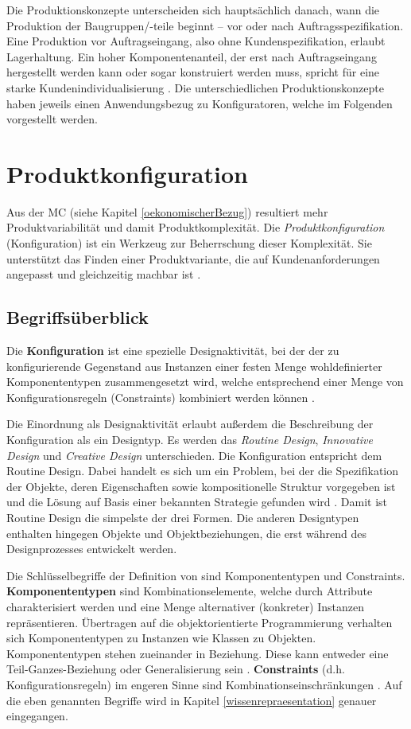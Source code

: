 \documentclass[11pt, a4paper, titlepage, listof=totoc, bibliography=totoc, index=totoc, twoside, openright, headings=normal]{scrreprt}
\begin{document}
Die Produktionskonzepte unterscheiden sich hauptsächlich danach, wann die Produktion der Baugruppen/-teile beginnt -- vor oder nach Auftragsspezifikation. Eine Produktion vor Auftragseingang, also ohne Kundenspezifikation, erlaubt Lagerhaltung. Ein hoher Komponentenanteil, der erst nach Auftragseingang hergestellt werden kann oder sogar konstruiert werden muss, spricht für eine starke Kundenindividualisierung \citep{lutz11}. Die unterschiedlichen Produktionskonzepte haben jeweils einen Anwendungsbezug zu Konfiguratoren, welche im Folgenden vorgestellt werden.

\section{Produktkonfiguration}
\label{Produktkonfiguration}
 
Aus der \ac{MC} (siehe Kapitel \ref{oekonomischerBezug}) resultiert mehr Produktvariabilität und damit Produktkomplexität. Die \emph{Produktkonfiguration} (Konfiguration) ist ein Werkzeug zur Beherrschung dieser Komplexität. Sie unterstützt das Finden einer Produktvariante, die auf Kundenanforderungen angepasst und gleichzeitig machbar ist \citep{lutz11}.

\subsection{Begriffsüberblick}
\label{begriffsuberblick}
Die \textbf{Konfiguration} ist eine spezielle Designaktivität, bei der der zu konfigurierende Gegenstand aus Instanzen einer festen Menge wohldefinierter Komponententypen zusammengesetzt wird, welche entsprechend einer Menge von Konfigurationsregeln (Constraints) kombiniert werden können \citep{sabin98}.

Die Einordnung als Designaktivität erlaubt außerdem die Beschreibung der Konfiguration als ein Designtyp. Es werden das \emph{Routine Design}, \emph{Innovative Design} und \emph{Creative Design} unterschieden. Die Konfiguration entspricht dem Routine Design. Dabei handelt es sich um ein Problem, bei der die Spezifikation der Objekte, deren Eigenschaften sowie kompositionelle Struktur vorgegeben ist und die Lösung auf Basis einer bekannten Strategie gefunden wird \citep{brown89}. Damit ist Routine Design die simpelste der drei Formen. Die anderen Designtypen enthalten hingegen Objekte und Objektbeziehungen, die erst während des Designprozesses entwickelt werden.

Die Schlüsselbegriffe der Definition von \citeauthor{sabin98} sind Komponententypen und Constraints. \textbf{Komponententypen} sind Kombinationselemente, welche durch Attribute charakterisiert werden und eine Menge alternativer (konkreter) Instanzen repräsentieren. Übertragen auf die objektorientierte Programmierung verhalten sich Komponententypen zu Instanzen wie Klassen zu Objekten. Komponententypen stehen zueinander in Beziehung. Diese kann entweder eine \glqq Teil-Ganzes\grqq{}-Beziehung oder Generalisierung sein \citep{felferning14}. \textbf{Constraints} (d.h. Konfigurationsregeln) im engeren Sinne sind Kombinationseinschränkungen \citep{felferning14}. Auf die eben genannten Begriffe wird in Kapitel \ref{wissenrepraesentation} genauer eingegangen.
\end{document}
